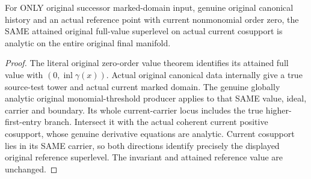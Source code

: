 \begin{theorem}
\label{hir:original-zero-order-full-reference-superlevel-analytic}
\leanok
{}
For ONLY original successor marked-domain input, genuine original canonical
history and an actual reference point with current nonmonomial order zero,
the SAME attained original full-value superlevel on actual current cosupport
is analytic on the entire original final manifold.
\end{theorem}
\begin{proof}
The literal original zero-order value theorem identifies its attained full
value with $(0,\operatorname{inl}\gamma(x))$. Actual original canonical data
internally give a true source-test tower and actual current marked domain.
The genuine globally analytic original monomial-threshold producer applies to
that SAME value, ideal, carrier and boundary. Its whole current-carrier locus
includes the true higher-first-entry branch. Intersect it with the actual
coherent current positive cosupport, whose genuine derivative equations are
analytic. Current cosupport lies in its SAME carrier, so both directions
identify precisely the displayed original reference superlevel. The invariant
and attained reference value are unchanged.
\end{proof}

